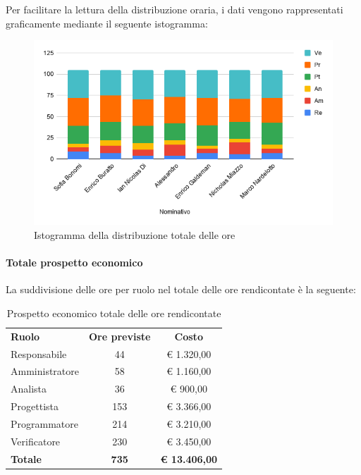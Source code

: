 \documentclass[../piano-di-progetto.tex]{subfiles}
\begin{document}
      Per facilitare la lettura della distribuzione oraria, i dati vengono rappresentati graficamente mediante il seguente istogramma:
      \begin{figure}[H]
        \centering
        \includegraphics[width=12cm]{img/ore-rendicontate.png}
        \caption{Istogramma della distribuzione totale delle ore}
        \label{fig:ore-rendicontate}
      \end{figure}
  
      \paragraph{Totale prospetto economico}
      La suddivisione delle ore per ruolo nel totale delle ore rendicontate è la seguente:
      \begin{table}[H]
        \centering
        \begin{tabular}{lcc}
          \rowcolor{lightgray}
          \textbf{Ruolo}  & \textbf{Ore previste} & \textbf{Costo}  \\
          Responsabile    & 44           & € 1.320,00           \\
          Amministratore  & 58           & € 1.160,00           \\
          Analista        & 36           & € 900,00             \\
          Progettista     & 153          & € 3.366,00           \\
          Programmatore   & 214          & € 3.210,00           \\
          Verificatore    & 230          & € 3.450,00           \\
          \textbf{Totale} & \textbf{735} & \textbf{€ 13.406,00}
        \end{tabular}
        \caption{Prospetto economico totale delle ore rendicontate}
      \end{table}
  
\end{document}
